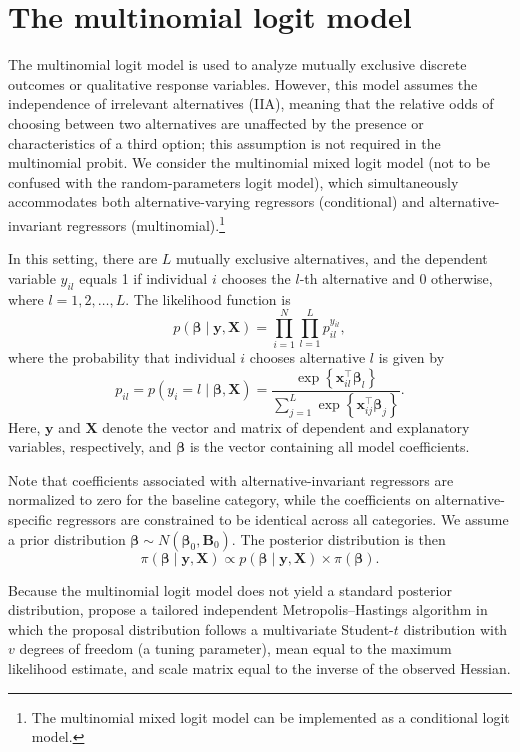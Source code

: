\section{The multinomial logit model}\label{sec65}

The multinomial logit model is used to analyze mutually exclusive discrete outcomes or qualitative response variables. However, this model assumes the independence of irrelevant alternatives (IIA), meaning that the relative odds of choosing between two alternatives are unaffected by the presence or characteristics of a third option; this assumption is not required in the multinomial probit. We consider the multinomial mixed logit model (not to be confused with the random-parameters logit model), which simultaneously accommodates both alternative-varying regressors (conditional) and alternative-invariant regressors (multinomial).\footnote{The multinomial mixed logit model can be implemented as a conditional logit model.}

In this setting, there are $L$ mutually exclusive alternatives, and the dependent variable $y_{il}$ equals 1 if individual $i$ chooses the $l$-th alternative and 0 otherwise, where $l = 1, 2, \dots, L$. The likelihood function is
\[
p(\bm{\beta} \mid \bm{y}, \bm{X}) = \prod_{i=1}^{N} \prod_{l=1}^{L} p_{il}^{y_{il}},
\]
where the probability that individual $i$ chooses alternative $l$ is given by
\[
p_{il} = p(y_i = l \mid \bm{\beta}, \bm{X}) = 
\frac{\exp\left\{\bm{x}_{il}^{\top} \bm{\beta}_l\right\}}{\sum_{j=1}^{L} \exp\left\{\bm{x}_{ij}^{\top} \bm{\beta}_j\right\}}.
\]
Here, $\bm{y}$ and $\bm{X}$ denote the vector and matrix of dependent and explanatory variables, respectively, and $\bm{\beta}$ is the vector containing all model coefficients.

Note that coefficients associated with alternative-invariant regressors are normalized to zero for the baseline category, while the coefficients on alternative-specific regressors are constrained to be identical across all categories. We assume a prior distribution $\bm{\beta} \sim N(\bm{\beta}_0, \bm{B}_0)$. The posterior distribution is then
\[
\pi(\bm{\beta} \mid \bm{y}, \bm{X}) \propto p(\bm{\beta} \mid \bm{y}, \bm{X}) \times \pi(\bm{\beta}).
\]

Because the multinomial logit model does not yield a standard posterior distribution, \cite{rossi2012bayesian} propose a tailored independent Metropolis--Hastings algorithm in which the proposal distribution follows a multivariate Student-$t$ distribution with $v$ degrees of freedom (a tuning parameter), mean equal to the maximum likelihood estimate, and scale matrix equal to the inverse of the observed Hessian.\\

